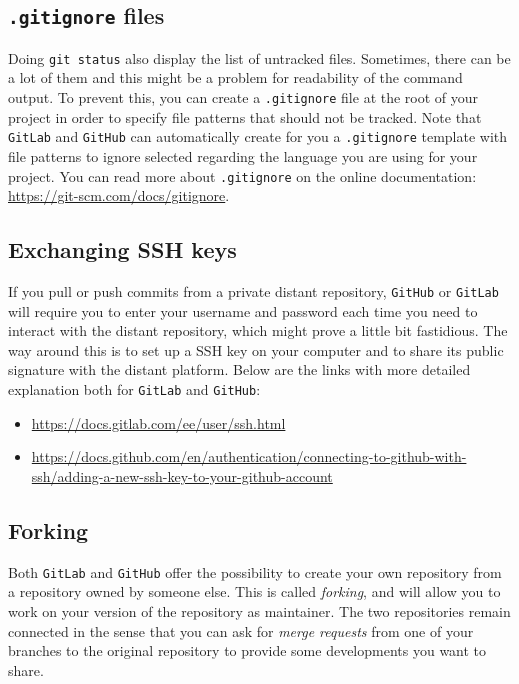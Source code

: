 \documentclass{article}
\begin{document}
\subsection{\texttt{.gitignore} files}

Doing \texttt{git status} also display the list of untracked files. Sometimes, there can be a lot of them and this might be a problem for readability of the command output. To prevent this, you can create a \texttt{.gitignore} file at the root of your project in order to specify file patterns that should not be tracked. Note that  \texttt{GitLab} and \texttt{GitHub} can automatically create for you a \texttt{.gitignore} template with file patterns to ignore selected regarding the language you are using for your project. You can read more about \texttt{.gitignore} on the online documentation: \url{https://git-scm.com/docs/gitignore}.

\subsection{Exchanging SSH keys}

If you pull or push commits from a private distant repository, \texttt{GitHub} or \texttt{GitLab} will require you to enter your username and password each time you need to interact with the distant repository, which might prove a little bit fastidious. The way around this is to set up a SSH key on your computer and to share its public signature with the distant platform. Below are the links with more detailed explanation both for \texttt{GitLab} and \texttt{GitHub}:
\begin{itemize}
    \item  \url{https://docs.gitlab.com/ee/user/ssh.html}
    \item \url{https://docs.github.com/en/authentication/connecting-to-github-with-ssh/adding-a-new-ssh-key-to-your-github-account}
\end{itemize}

\subsection{Forking}

Both \texttt{GitLab} and \texttt{GitHub} offer the possibility to create your own repository from a repository owned by someone else. This is called \textit{forking}, and will allow you to work on your version of the repository as maintainer. The two repositories remain connected in the sense that you can ask for \textit{merge requests} from one of your branches to the original repository to provide some developments you want to share.
\end{document}
